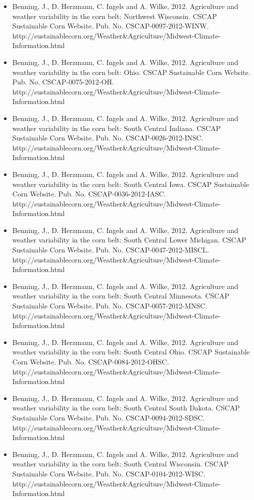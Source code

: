 \begin{itemize}
\item Benning, J., D. Herzmann, C. Ingels and A. Wilke, 2012. Agriculture and weather variability in the corn belt: Northwest Wisconsin. CSCAP Sustainable Corn Website. Pub. No. CSCAP-0097-2012-WINW. http://sustainablecorn.org/Weather\&Agriculture/Midwest-Climate-Information.html
\item Benning, J., D. Herzmann, C. Ingels and A. Wilke, 2012. Agriculture and weather variability in the corn belt: Ohio. CSCAP Sustainable Corn Website. Pub. No. CSCAP-0075-2012-OH. http://sustainablecorn.org/Weather\&Agriculture/Midwest-Climate-Information.html
\item Benning, J., D. Herzmann, C. Ingels and A. Wilke, 2012. Agriculture and weather variability in the corn belt: South Central Indiana. CSCAP Sustainable Corn Website. Pub. No. CSCAP-0026-2012-INSC. http://sustainablecorn.org/Weather\&Agriculture/Midwest-Climate-Information.html
\item Benning, J., D. Herzmann, C. Ingels and A. Wilke, 2012. Agriculture and weather variability in the corn belt: South Central Iowa. CSCAP Sustainable Corn Website. Pub. No. CSCAP-0036-2012-IASC. http://sustainablecorn.org/Weather\&Agriculture/Midwest-Climate-Information.html
\item Benning, J., D. Herzmann, C. Ingels and A. Wilke, 2012. Agriculture and weather variability in the corn belt: South Central Lower Michigan. CSCAP Sustainable Corn Website. Pub. No. CSCAP-0047-2012-MISCL. http://sustainablecorn.org/Weather\&Agriculture/Midwest-Climate-Information.html
\item Benning, J., D. Herzmann, C. Ingels and A. Wilke, 2012. Agriculture and weather variability in the corn belt: South Central Minnesota. CSCAP Sustainable Corn Website. Pub. No. CSCAP-0057-2012-MNSC. http://sustainablecorn.org/Weather\&Agriculture/Midwest-Climate-Information.html
\item Benning, J., D. Herzmann, C. Ingels and A. Wilke, 2012. Agriculture and weather variability in the corn belt: South Central Ohio. CSCAP Sustainable Corn Website. Pub. No. CSCAP-0084-2012-OHSC. http://sustainablecorn.org/Weather\&Agriculture/Midwest-Climate-Information.html
\item Benning, J., D. Herzmann, C. Ingels and A. Wilke, 2012. Agriculture and weather variability in the corn belt: South Central South Dakota. CSCAP Sustainable Corn Website. Pub. No. CSCAP-0094-2012-SDSC. http://sustainablecorn.org/Weather\&Agriculture/Midwest-Climate-Information.html
\item Benning, J., D. Herzmann, C. Ingels and A. Wilke, 2012. Agriculture and weather variability in the corn belt: South Central Wisconsin. CSCAP Sustainable Corn Website. Pub. No. CSCAP-0104-2012-WISC. http://sustainablecorn.org/Weather\&Agriculture/Midwest-Climate-Information.html

\end{itemize}
